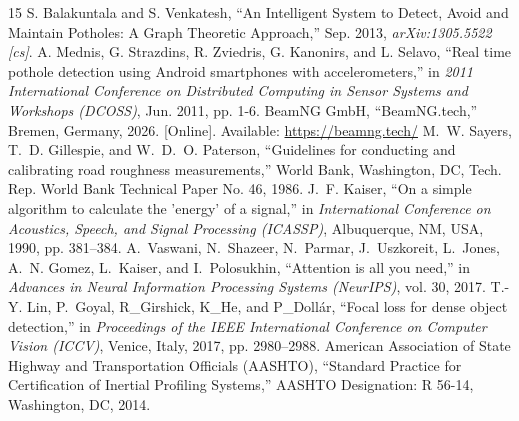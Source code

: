 \documentclass[conference]{IEEEtran}
\begin{document}
\begin{thebibliography}{15}
 S. Balakuntala and S. Venkatesh, ``An Intelligent System to Detect, Avoid and Maintain Potholes: A Graph Theoretic Approach,'' Sep. 2013, \textit{arXiv:1305.5522 [cs]}.
 A. Mednis, G. Strazdins, R. Zviedris, G. Kanonirs, and L. Selavo, ``Real time pothole detection using Android smartphones with accelerometers,'' in \textit{2011 International Conference on Distributed Computing in Sensor Systems and Workshops (DCOSS)}, Jun. 2011, pp. 1-6.
 BeamNG GmbH, ``BeamNG.tech,'' Bremen, Germany, 2026. [Online]. Available: \url{https://beamng.tech/}
M.~W. Sayers, T.~D. Gillespie, and W.~D.~O. Paterson, ``Guidelines for conducting and calibrating road roughness measurements,'' World Bank, Washington, DC, Tech. Rep. World Bank Technical Paper No. 46, 1986.
J.~F. Kaiser, ``On a simple algorithm to calculate the 'energy' of a signal,'' in \textit{International Conference on Acoustics, Speech, and Signal Processing (ICASSP)}, Albuquerque, NM, USA, 1990, pp. 381--384.
A.~Vaswani, N.~Shazeer, N.~Parmar, J.~Uszkoreit, L.~Jones, A.~N. Gomez, L.~Kaiser, and I.~Polosukhin, ``Attention is all you need,'' in \textit{Advances in Neural Information Processing Systems (NeurIPS)}, vol. 30, 2017.
T.-Y. Lin, P.~Goyal, R_Girshick, K_He, and P_Doll{{\'a}}r, ``Focal loss for dense object detection,'' in \textit{Proceedings of the IEEE International Conference on Computer Vision (ICCV)}, Venice, Italy, 2017, pp. 2980--2988.
American Association of State Highway and Transportation Officials (AASHTO), ``Standard Practice for Certification of Inertial Profiling Systems,'' AASHTO Designation: R 56-14, Washington, DC, 2014.
\end{thebibliography}
\end{document}
